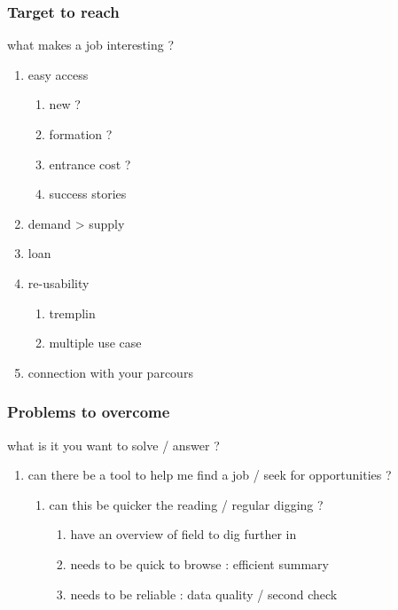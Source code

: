 \documentclass[11pt]{article}
\begin{document}
\subsubsection{Target to reach}
\label{sec:org1097f5d}
what makes a job interesting ?
\begin{enumerate}
\item easy access
\label{sec:org0900672}
\begin{enumerate}
\item new ?
\label{sec:org76e574d}
\item formation ?
\label{sec:org752c805}
\item entrance cost ?
\label{sec:org61c39a7}
\item success stories
\label{sec:org6a57b8f}
\end{enumerate}
\item demand > supply
\label{sec:org52748d4}
\item loan
\label{sec:orgb25e86d}
\item re-usability
\label{sec:orgcde00d8}
\begin{enumerate}
\item tremplin
\label{sec:org3847698}
\item multiple use case
\label{sec:org6a965e9}
\end{enumerate}
\item connection with your parcours
\label{sec:org10b896a}
\end{enumerate}
\subsubsection{Problems to overcome}
\label{sec:org744da42}
what is it you want to solve / answer ?
\begin{enumerate}
\item can there be a tool to help me find a job / seek for opportunities ?
\label{sec:orgecf5914}
\begin{enumerate}
\item can this be quicker the reading / regular digging ?
\label{sec:org7ca01de}
\begin{enumerate}
\item have an overview of field to dig further in
\label{sec:org21ef2f3}
\item needs to be quick to browse : efficient summary
\label{sec:org94dbf30}
\item needs to be reliable : data quality / second check
\label{sec:orgde8c629}
\end{enumerate}
\end{enumerate}
\end{enumerate}
\end{document}
